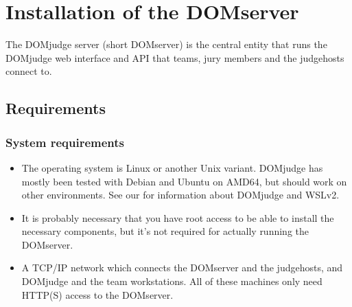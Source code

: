 \documentclass[a4paper,10pt,english,openany]{sphinxmanual}
\begin{document}
\sphinxstepscope


\section{Installation of the DOMserver}
\label{\detokenize{install-domserver:installation-of-the-domserver}}\label{\detokenize{install-domserver::doc}}
\sphinxAtStartPar
The DOMjudge server (short DOMserver) is the central entity that runs
the DOMjudge web interface and API that teams, jury members and the
judgehosts connect to.


\subsection{Requirements}
\label{\detokenize{install-domserver:requirements}}\label{\detokenize{install-domserver:domserver-requirements}}

\subsubsection{System requirements}
\label{\detokenize{install-domserver:system-requirements}}\begin{itemize}
\item {} 
\sphinxAtStartPar
The operating system is Linux or another Unix variant. DOMjudge has mostly
been tested with Debian and Ubuntu on AMD64, but should work on other environments.
See our  for information about DOMjudge and WSLv2.

\item {} 
\sphinxAtStartPar
It is probably necessary that you have root access to be able to install
the necessary components, but it’s not required for actually running the
DOMserver.

\item {} 
\sphinxAtStartPar
A TCP/IP network which connects the DOMserver and the judgehosts, and
DOMjudge and the team workstations. All of these machines only need HTTP(S)
access to the DOMserver.

\end{itemize}
\end{document}
